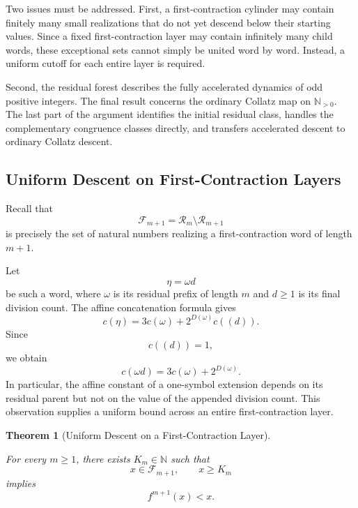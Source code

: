 \documentclass[12pt, oneside]{article}
\numberwithin{equation}{section}
\theoremstyle{definition}
\theoremstyle{plain}
\newtheorem{theorem}{Theorem}[section]
\theoremstyle{remark}
\begin{document}
Two issues must be addressed. First, a first-contraction cylinder may contain
finitely many small realizations that do not yet descend below their starting
values. Since a fixed first-contraction layer may contain infinitely many
child words, these exceptional sets cannot simply be united word by word.
Instead, a uniform cutoff for each entire layer is required.

Second, the residual forest describes the fully accelerated dynamics of odd
positive integers. The final result concerns the ordinary Collatz map on
\(\mathbb N_{>0}\). The last part of the argument identifies the initial
residual class, handles the complementary congruence classes directly, and
transfers accelerated descent to ordinary Collatz descent.

\subsection{Uniform Descent on First-Contraction Layers}

Recall that
\[
\mathcal F_{m+1}
=
\mathcal R_m\setminus\mathcal R_{m+1}
\]
is precisely the set of natural numbers realizing a first-contraction word of
length \(m+1\).

Let
\[
\eta=\omega d
\]
be such a word, where \(\omega\) is its residual prefix of length \(m\) and
\(d\ge1\) is its final division count. The affine concatenation formula gives
\[
c(\eta)
=
3c(\omega)+2^{D(\omega)}c((d)).
\]
Since
\[
c((d))=1,
\]
we obtain
\[
\boxed{
c(\omega d)
=
3c(\omega)+2^{D(\omega)}.
}
\]
In particular, the affine constant of a one-symbol extension depends on its
residual parent but not on the value of the appended division count.
This observation supplies a uniform bound across an entire
first-contraction layer.

\begin{theorem}[Uniform Descent on a First-Contraction Layer]
\label{thm:uniform-layer-descent}

For every \(m\ge1\), there exists \(K_m\in\mathbb N\) such that
\[
x\in\mathcal F_{m+1},
\qquad
x\ge K_m
\]
implies
\[
f^{m+1}(x)<x.
\]
\end{theorem}
\end{document}
